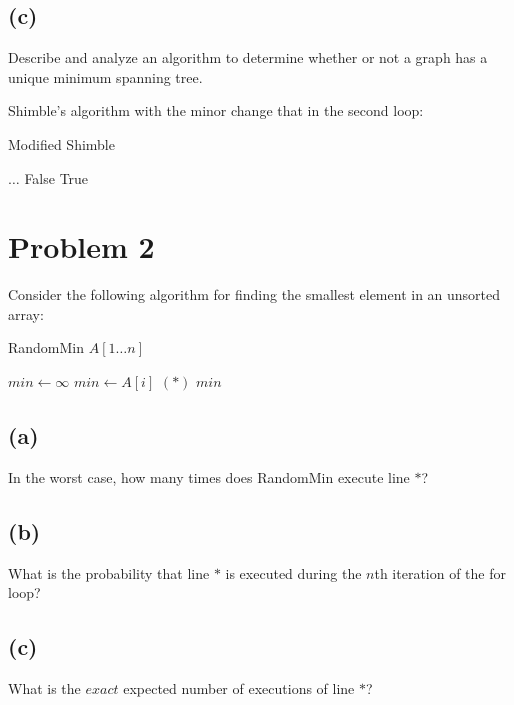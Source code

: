 \documentclass[12pt]{article}
\begin{document}
\subsection*{(c)}
Describe and analyze an algorithm to determine whether or not a graph
has a unique minimum spanning tree.

Shimble's algorithm with the minor change that in the second loop:
\begin{algorithm}
\caption{Modified Shimble}
\begin{algorithmic}
  \STATE
  \STATE $\ldots$
  \STATE
      \RETURN False
    \ENDIF
  \RETURN True
  \ENDFOR
\end{algorithmic}
\end{algorithm}


\section*{Problem 2}
Consider the following algorithm for finding the smallest element in an
unsorted array:

\begin{algorithm}
    \caption{RandomMin $A [1 \ldots n]$}
\begin{algorithmic}
  \STATE $min \leftarrow \infty$
  \STATE $min \leftarrow A [i]$ \hspace{1 cm} $(*)$
  \ENDIF
  \ENDFOR
  \RETURN $min$
\end{algorithmic}
\end{algorithm}

\subsection*{(a)}
In the worst case, how many times does RandomMin execute line \(*\)?

\subsection*{(b)}
What is the probability that line \(*\) is executed during the $n$th
iteration of the for loop?

\subsection*{(c)}
What is the $exact$ expected number of executions of line \(*\)?
\end{document}
